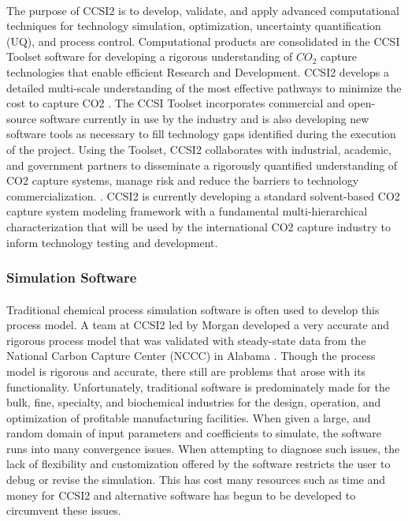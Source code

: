 \documentclass[12pt, letterpaper]{article}
\begin{document}
\paragraph{}
The purpose of CCSI2 is to develop, validate, and apply advanced computational techniques for technology simulation, optimization, uncertainty quantification (UQ), and process control. Computational products are consolidated in the CCSI Toolset software for developing a rigorous understanding of $CO_2$ capture technologies that enable efficient Research and Development. CCSI2 develops a detailed multi-scale understanding of the most effective pathways to minimize the cost to capture CO2 \cite{NETLwebsite}.  The CCSI Toolset incorporates commercial and open-source software currently in use by the industry and is also developing new software tools as necessary to fill technology gaps identified during the execution of the project. Using the Toolset, CCSI2 collaborates with industrial, academic, and government partners to disseminate a rigorously quantified understanding of CO2 capture systems, manage risk and reduce the barriers to technology commercialization. \cite{NETLwebsite}. CCSI2 is currently developing a standard solvent-based CO2 capture system modeling framework with a fundamental multi-hierarchical characterization that will be used by the international CO2 capture industry to inform technology testing and development.


\subsubsection{Simulation Software}

\paragraph{}
 Traditional chemical process simulation software is often used to develop this process model.  A team at CCSI2 led by Morgan developed a very accurate and rigorous process model that was validated with steady-state data from the National Carbon Capture Center (NCCC) in Alabama \cite{Morgan2018}. Though the process model is rigorous and accurate, there still are problems that arose with its functionality. Unfortunately, traditional software is predominately made for the bulk, fine, specialty, and biochemical industries for the design, operation, and optimization of profitable manufacturing facilities.  When given a large, and random domain of input parameters and coefficients to simulate, the software runs into many convergence issues. When attempting to diagnose such issues, the lack of flexibility and customization offered by the software restricts the user to debug or revise the simulation.  This has cost many resources such as time and money for CCSI2 and alternative software has begun to be developed to circumvent these issues. 
\end{document}
